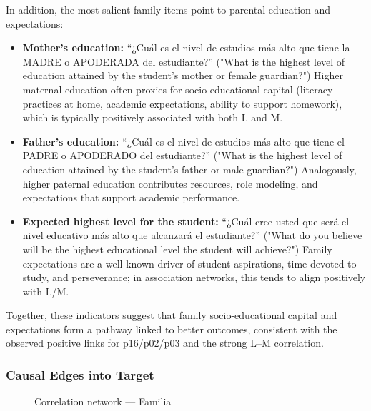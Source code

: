 \documentclass[11pt, a4paper]{article}
\begin{document}
In addition, the most salient family items point to parental education and expectations:
\begin{itemize}
  \item \textbf{Mother’s education:} ``¿Cuál es el nivel de estudios más alto que tiene la MADRE o APODERADA del estudiante?'' ("What is the highest level of education attained by the student's mother or female guardian?") Higher maternal education often proxies for socio-educational capital (literacy practices at home, academic expectations, ability to support homework), which is typically positively associated with both L and M.
  \item \textbf{Father’s education:} ``¿Cuál es el nivel de estudios más alto que tiene el PADRE o APODERADO del estudiante?'' ("What is the highest level of education attained by the student's father or male guardian?") Analogously, higher paternal education contributes resources, role modeling, and expectations that support academic performance.
  \item \textbf{Expected highest level for the student:} ``¿Cuál cree usted que será el nivel educativo más alto que alcanzará el estudiante?'' ("What do you believe will be the highest educational level the student will achieve?") Family expectations are a well-known driver of student aspirations, time devoted to study, and perseverance; in association networks, this tends to align positively with L/M.
\end{itemize}
Together, these indicators suggest that family socio-educational capital and expectations form a pathway linked to better outcomes, consistent with the observed positive links for p16/p02/p03 and the strong L–M correlation.

\subsubsection*{Causal Edges into Target}
\begin{figure}[h]
  \centering
  \caption{Correlation network — Familia}
\end{figure}
\end{document}
